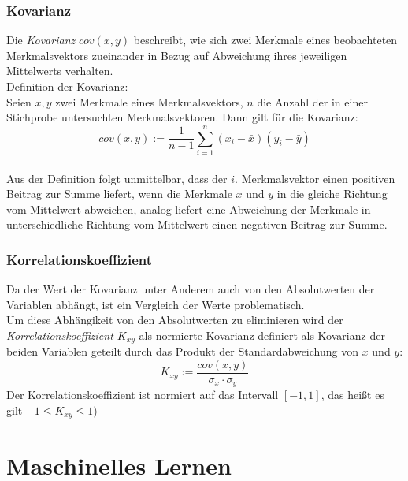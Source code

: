 \documentclass[a4paper]{scrartcl}
\begin{document}
\begin{multicols}{2}
                    \subsubsection{Kovarianz}
                        Die \emph{Kovarianz} $cov(x,y)$ beschreibt, wie sich zwei Merkmale eines beobachteten Merkmalsvektors zueinander in Bezug auf Abweichung ihres jeweiligen Mittelwerts verhalten. \cite{ertel2016}\\
                        Definition der Kovarianz:\\
                        Seien $x,y$ zwei Merkmale eines Merkmalsvektors, $n$ die Anzahl der in einer Stichprobe untersuchten Merkmalsvektoren. Dann gilt für die Kovarianz:
                        $$
                            cov(x,y) := \frac{1}{n-1}\sum_{i=1}^n(x_i - \bar{x})(y_i - \bar{y})
                        $$ \cite{kohn2005}\\
                        Aus der Definition folgt unmittelbar, dass der $i$. Merkmalsvektor einen positiven Beitrag zur Summe liefert, wenn die Merkmale $x$ und $y$ in die gleiche Richtung vom Mittelwert abweichen, analog liefert eine Abweichung der Merkmale in unterschiedliche Richtung vom Mittelwert einen negativen Beitrag zur Summe. \cite{ertel2016}

                    \subsubsection{Korrelationskoeffizient}
                        Da der Wert der Kovarianz unter Anderem auch von den Absolutwerten der Variablen abhängt, ist ein Vergleich der Werte problematisch.
                        \cite{ertel2016} \\
                        Um diese Abhängikeit von den Absolutwerten zu eliminieren wird der \emph{Korrelationskoeffizient $K_{xy}$} als normierte Kovarianz definiert als Kovarianz der beiden Variablen geteilt durch das Produkt der Standardabweichung von $x$ und $y$:
                        $$
                            K_{xy} := \frac{cov(x,y)}{\sigma_x \cdot \sigma_y} 
                        $$
                        Der Korrelationskoeffizient ist normiert auf das Intervall $[-1,1]$, das heißt es gilt $-1 \leq K_{xy} \leq 1)$
                        \cite{kohn2005}


        \section{Maschinelles Lernen}
            

\end{multicols}
\end{document}
